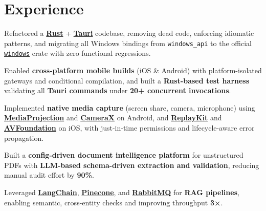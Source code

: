 \documentclass[]{deedy-resume-openfont}
\begin{document}
\begin{minipage}[t]{0.66\textwidth} 


\section{Experience}

\begin{tightemize} \vspace{10pt}
\item Refactored a \href{https://www.rust-lang.org/}{\textbf{Rust}} + \href{https://v2.tauri.app/}{\textbf{Tauri}} codebase, removing dead code, enforcing idiomatic patterns, and migrating all Windows bindings from \texttt{windows\_api} to the official \href{https://crates.io/crates/windows}{\texttt{windows}} crate with zero functional regressions.
\item Enabled \textbf{cross-platform mobile builds} (iOS \& Android) with platform-isolated gateways and conditional compilation, and built a \textbf{Rust-based test harness} validating all \textbf{Tauri commands} under \textbf{20+ concurrent invocations}.
\item Implemented \textbf{native media capture} (screen share, camera, microphone) using \href{https://developer.android.com/guide/topics/large-screens/media-projection}{\textbf{MediaProjection}} and \href{https://developer.android.com/training/camerax}{\textbf{CameraX}} on Android, and \href{https://developer.apple.com/documentation/replaykit}{\textbf{ReplayKit}} and \href{https://developer.apple.com/documentation/avfoundation}{\textbf{AVFoundation}} on iOS, with just-in-time permissions and lifecycle-aware error propagation.
\end{tightemize}

\sectionsep

\begin{tightemize}
\item Built a \textbf{config-driven document intelligence platform} for unstructured PDFs with \textbf{LLM-based schema-driven extraction and validation}, reducing manual audit effort by \textbf{90\%}.
\item Leveraged \href{https://www.langchain.com/}{\textbf{LangChain}}, \href{https://www.pinecone.io/}{\textbf{Pinecone}}, and \href{https://www.rabbitmq.com/}{\textbf{RabbitMQ}} for \textbf{RAG pipelines}, enabling semantic, cross-entity checks and improving throughput \textbf{3×}.
\end{tightemize}


\end{minipage}
\end{document}
